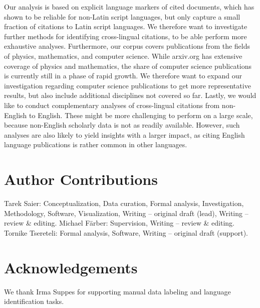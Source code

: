 Our analysis is based on explicit language markers of cited documents, which has shown to be reliable for non-Latin script languages, but only capture a small fraction of citations to Latin script languages. We therefore want to investigate further methods for identifying cross-lingual citations, to be able perform more exhaustive analyses. Furthermore, our corpus covers publications from the fields of physics, mathematics, and computer science. While arxiv.org has extensive coverage of physics and mathematics, the share of computer science publications is currently still in a phase of rapid growth. We therefore want to expand our investigation regarding computer science publications to get more representative results, but also include additional disciplines not covered so far.
Lastly, we would like to conduct complementary analyses of cross-lingual citations from non-English to English. These might be more challenging to perform on a large scale, because non-English scholarly data is not as readily available. However, such analyses are also likely to yield insights with a larger impact, as citing English language publications is rather common in other languages.

\section*{Author Contributions}  %
Tarek Saier: Conceptualization, Data curation, Formal analysis, Investigation, Methodology, Software, Visualization, Writing -- original draft (lead), Writing -- review \& editing. Michael F{\"a}rber: Supervision, Writing -- review \& editing. Tornike Tsereteli: Formal analysis, Software, Writing -- original draft (support).

\section*{Acknowledgements}
We thank Irma Suppes for supporting manual data labeling and language identification tasks.

